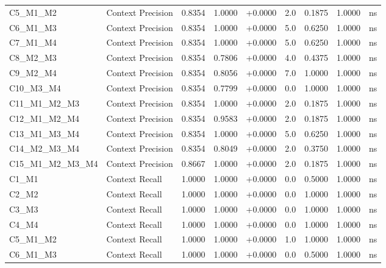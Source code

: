 \begin{table}[p]
\begin{tabular*}{\textwidth}{@{\extracolsep{\fill}} l l r r r r r r c @{}}
\addlinespace
C5\_M1\_M2      & Context Precision    & 0.8354 & 1.0000 & +0.0000 & 2.0 & 0.1875 & 1.0000 & ns \\
\addlinespace
C6\_M1\_M3      & Context Precision    & 0.8354 & 1.0000 & +0.0000 & 5.0 & 0.6250 & 1.0000 & ns \\
\addlinespace
C7\_M1\_M4      & Context Precision    & 0.8354 & 1.0000 & +0.0000 & 5.0 & 0.6250 & 1.0000 & ns \\
\addlinespace
C8\_M2\_M3      & Context Precision    & 0.8354 & 0.7806 & +0.0000 & 4.0 & 0.4375 & 1.0000 & ns \\
\addlinespace
C9\_M2\_M4      & Context Precision    & 0.8354 & 0.8056 & +0.0000 & 7.0 & 1.0000 & 1.0000 & ns \\
\addlinespace
C10\_M3\_M4     & Context Precision    & 0.8354 & 0.7799 & +0.0000 & 0.0 & 1.0000 & 1.0000 & ns \\
\addlinespace
C11\_M1\_M2\_M3 & Context Precision    & 0.8354 & 1.0000 & +0.0000 & 2.0 & 0.1875 & 1.0000 & ns \\
\addlinespace
C12\_M1\_M2\_M4 & Context Precision    & 0.8354 & 0.9583 & +0.0000 & 2.0 & 0.1875 & 1.0000 & ns \\
\addlinespace
C13\_M1\_M3\_M4 & Context Precision    & 0.8354 & 1.0000 & +0.0000 & 5.0 & 0.6250 & 1.0000 & ns \\
\addlinespace
C14\_M2\_M3\_M4 & Context Precision    & 0.8354 & 0.8049 & +0.0000 & 2.0 & 0.3750 & 1.0000 & ns \\
\addlinespace
C15\_M1\_M2\_M3\_M4 & Context Precision    & 0.8667 & 1.0000 & +0.0000 & 2.0 & 0.1875 & 1.0000 & ns \\
\addlinespace
C1\_M1          & Context Recall       & 1.0000 & 1.0000 & +0.0000 & 0.0 & 0.5000 & 1.0000 & ns \\
\addlinespace
C2\_M2          & Context Recall       & 1.0000 & 1.0000 & +0.0000 & 0.0 & 1.0000 & 1.0000 & ns \\
\addlinespace
C3\_M3          & Context Recall       & 1.0000 & 1.0000 & +0.0000 & 0.0 & 1.0000 & 1.0000 & ns \\
\addlinespace
C4\_M4          & Context Recall       & 1.0000 & 1.0000 & +0.0000 & 0.0 & 1.0000 & 1.0000 & ns \\
\addlinespace
C5\_M1\_M2      & Context Recall       & 1.0000 & 1.0000 & +0.0000 & 1.0 & 1.0000 & 1.0000 & ns \\
\addlinespace
C6\_M1\_M3      & Context Recall       & 1.0000 & 1.0000 & +0.0000 & 0.0 & 0.5000 & 1.0000 & ns \\

\end{tabular*}
\end{table}
